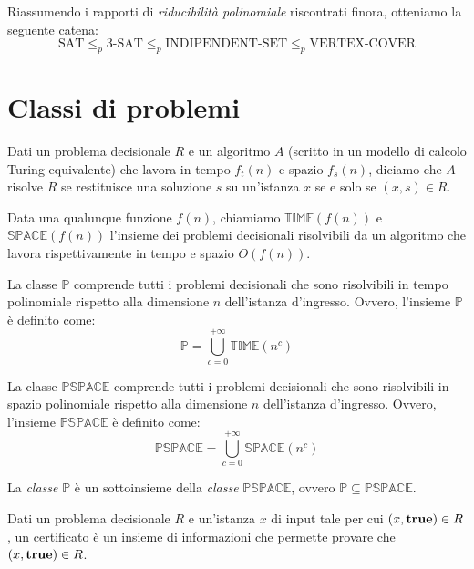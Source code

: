 \noindent
Riassumendo i rapporti di \emph{riducibilità polinomiale} riscontrati finora,
otteniamo la seguente catena:
\[\text{SAT}\leq_p\text{3-SAT}\leq_p\text{INDIPENDENT-SET}\leq_p\text{VERTEX-COVER}\]

\section{Classi di problemi}
\begin{definition}[Algoritmo]
    Dati un problema decisionale $R$ e un algoritmo $A$ (scritto in un modello
    di calcolo Turing-equivalente) che lavora in tempo $f_t(n)$ e spazio $f_s(n)$,
    diciamo che $A$ risolve $R$ se restituisce una soluzione $s$ su un'istanza
    $x$ se e solo se $(x,s)\in R$.
\end{definition}
\begin{definition}
    Data una qualunque funzione $f(n)$, chiamiamo $\mathbb{TIME}(f(n))$ e
    $\mathbb{SPACE}(f(n))$ l'insieme dei problemi decisionali risolvibili da un
    algoritmo che lavora rispettivamente in tempo e spazio $O(f(n))$.
\end{definition}
\begin{definition}
    La classe $\mathbb{P}$ comprende tutti i problemi decisionali che sono
    risolvibili in tempo polinomiale rispetto alla dimensione $n$ dell'istanza
    d'ingresso. Ovvero, l'insieme $\mathbb{P}$ è definito come:
    \[\mathbb{P}=\bigcup_{c=0}^{+\infty}\mathbb{TIME}(n^c)\]
\end{definition}
\begin{definition}
    La classe $\mathbb{PSPACE}$ comprende tutti i problemi decisionali che sono
    risolvibili in spazio polinomiale rispetto alla dimensione $n$ dell'istanza
    d'ingresso. Ovvero, l'insieme $\mathbb{PSPACE}$ è definito come:
    \[\mathbb{PSPACE}=\bigcup_{c=0}^{+\infty}\mathbb{SPACE}(n^c)\]
\end{definition}
\begin{note}
    La \emph{classe} $\mathbb{P}$ è un sottoinsieme della \emph{classe}
    $\mathbb{PSPACE}$, ovvero $\mathbb{P}\subseteq\mathbb{PSPACE}$.
\end{note}

\begin{definition}[Certificato]
    Dati un problema decisionale $R$ e un'istanza $x$ di input tale per cui
    $(x,{\bf true})\in R$, un certificato è un insieme di informazioni che
    permette provare che $(x,{\bf true})\in R$.
\end{definition}

